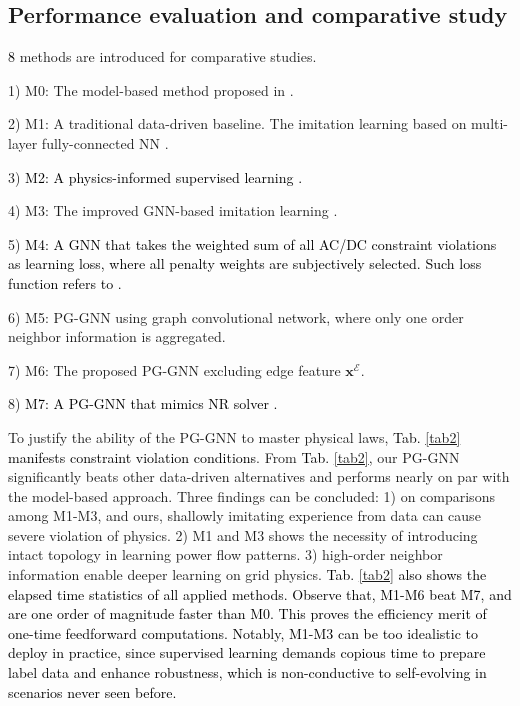 \documentclass[lettersize,journal]{IEEEtran}
\begin{document}
\vspace{-1em}
\subsection{ Performance evaluation and comparative study }
\textcolor{black}{8} methods are introduced for comparative studies.

1) M0: The model-based method proposed in \cite{r3a}.

2) M1: A traditional data-driven baseline. The imitation learning based on multi-layer fully-connected NN \cite{r5}.

3) \textcolor{black}{M2: A physics-informed supervised learning \cite{r12}.} 

4) M3: The improved GNN-based imitation learning \cite{r7}. 

5) \textcolor{black}{M4: A GNN that takes the weighted sum of all AC/DC constraint violations as learning loss, where all penalty weights are subjectively selected. Such loss function refers to \cite{r10}.} 

6) M5: PG-GNN using graph convolutional network, where only one order neighbor information is aggregated.

7) M6: The proposed PG-GNN excluding edge feature $\boldsymbol{x}^{\mathcal{E}}$. 

8) \textcolor{black}{M7: A PG-GNN that mimics NR solver \cite{r11}.}

To justify the ability of the PG-GNN to master physical laws, \textcolor{black}{Tab. \ref{tab2} manifests constraint violation conditions}. From \textcolor{black}{Tab. \ref{tab2}}, our PG-GNN significantly beats other data-driven alternatives and performs nearly on par with the model-based approach. Three findings can be concluded: 1) on comparisons among M1-M3, and ours, shallowly imitating experience from data can cause severe violation of physics. 2) M1 and M3 shows the necessity of introducing intact topology in learning power flow patterns. 3) high-order neighbor information enable deeper learning on grid physics.
\textcolor{black}{Tab. \ref{tab2} also shows the elapsed time statistics of all applied methods. Observe that, M1-M6 beat M7, and are one order of magnitude faster than M0. This proves the efficiency merit of one-time feedforward computations. Notably, M1-M3 can be too idealistic to deploy in practice, since supervised learning demands copious time to prepare label data and enhance robustness, which is non-conductive to self-evolving in scenarios never seen before.}
\end{document}
